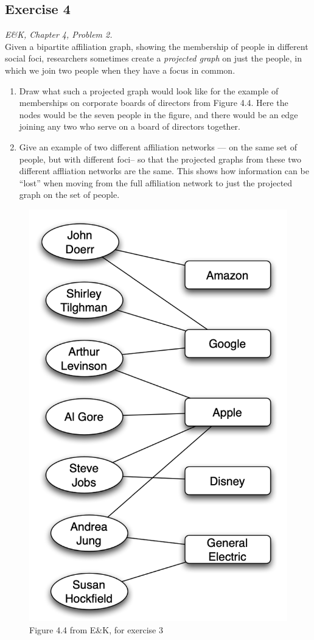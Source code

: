 \documentclass{tufte-handout}
\begin{document}
\begin{fullwidth}
\section*{\textbf{Exercise 4}}
\textit{E\&K, Chapter 4, Problem 2.}\\
Given a bipartite affiliation graph, showing the membership of people in different social foci, researchers sometimes create a \textit{projected graph} on just the people, in which we join two people when they have a focus in common.
\begin{enumerate}
    \item Draw what such a projected graph would look like for the example of memberships on corporate boards of directors from Figure 4.4. Here the nodes would be the seven people in the figure, and there would be an edge joining any two who serve on a board of directors together.
    \item Give an example of two different affiliation networks — on the same set of people, but with different foci-- so that the projected graphs from these two different affliation networks are the same. This shows how information can be ``lost'' when moving from the full affiliation network to just the projected graph on the set of people.
\end{enumerate}
\begin{figure}[!h]
    \centering
    \includegraphics[width = .27\textwidth]{ek444.png}
    \caption{Figure 4.4 from E\&K, for exercise 3}
\end{figure}

\end{fullwidth}
\end{document}
